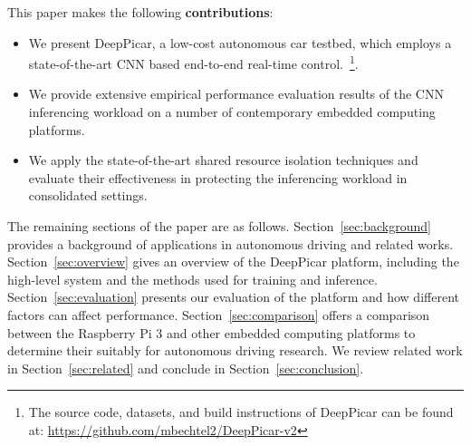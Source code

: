 

This paper makes the following {\bf contributions}:
\begin{itemize}
  \item We present DeepPicar, a low-cost autonomous car testbed, which
    employs a state-of-the-art CNN based end-to-end
    real-time control.~\footnote{The source code, datasets, and build
      instructions of DeepPicar can be found at:
      \url{https://github.com/mbechtel2/DeepPicar-v2}}.
  \item We provide extensive empirical performance evaluation results
    of the CNN inferencing workload on a number of contemporary
    embedded computing platforms.
  \item We apply the state-of-the-art shared resource isolation
    techniques and evaluate their effectiveness in protecting the
    inferencing workload in consolidated settings.
\end{itemize}

The remaining sections of the paper are as follows.
Section~\ref{sec:background}
provides a background of applications in autonomous driving and related works.
Section~\ref{sec:overview} gives an overview of the DeepPicar
platform, including the high-level system and the methods used for
training and inference. Section~\ref{sec:evaluation} presents our
evaluation of the platform and how different factors can affect
performance. Section~\ref{sec:comparison} offers a comparison between  
the Raspberry Pi 3 and other embedded computing platforms to 
determine their suitably for autonomous driving research.
We review related work in
Section~\ref{sec:related} and conclude in
Section~\ref{sec:conclusion}.

